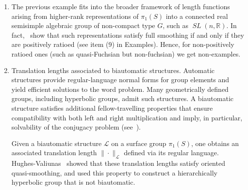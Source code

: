 \documentclass[11pt]{amsart}
\numberwithin{equation}{section}
\numberwithin{figure}{section}
\theoremstyle{definition}
\newtheorem{question}[theorem]{Question}
\theoremstyle{plain}
\DeclareMathOperator{\SL}{\mathit{SL}}
\newcommand{\QConvex}{\mathrm{QConvex}}
\begin{document}
\begin{enumerate}
\begin{question}
  Let $\rho$ be a
quasi-Fuchsian representation, and let $R>0$ be the \emph{quasi-smoothing
constant}, i.e., the minimal $R>0$ so that $\ell_{\rho} \in \QConvex_R(S)$. 
Does $R \to \infty$ as the quasi-Fuchsian constant of~$\rho$ goes to $\infty$?
\end{question}

\item The previous example fits into the broader framework of length
functions arising from higher-rank representations of
$\pi_1(S)$ into a connected real semisimple algebraic group of
non-compact type $G$, such as $\SL(n,\mathbb{R})$.
In fact,~\cite[Theorem~1.1]{MZ19:PositivelyRatioed} show that such representations
satisfy full smoothing if and only if they are positively ratioed (see item (9) in Examples). Hence, for non-positively ratioed ones (such as quasi-Fuchsian but non-fuchsian) we get non-examples.
        \item  Translation lengths associated to biautomatic structures. Automatic structures provide regular-language normal forms for group
elements and yield efficient solutions to the word problem. Many
geometrically defined groups, including hyperbolic groups, admit such
structures. A biautomatic structure satisfies additional
fellow-travelling properties that ensure compatibility with both left
and right multiplication and imply, in particular, solvability of the
conjugacy problem (see~\cite[Section~2.2]{HV24:Biautomaticity}).

Given a biautomatic structure $\mathcal{L}$ on a surface group
$\pi_1(S)$, one obtains an associated translation length
$\|\cdot\|_{\mathcal{L}}$ defined via its regular language.
Hughes-Valiunas~\cite[Proposition~4.2]{HV24:Biautomaticity} showed that
these translation lengths satisfy oriented quasi-smoothing, and used
this property to construct a hierarchically hyperbolic group that is
not biautomatic. 


\end{enumerate}
\end{document}
